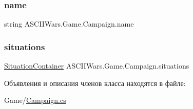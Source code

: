 \subsubsection{\texorpdfstring{name}{name}}
{\footnotesize\ttfamily string A\+S\+C\+I\+I\+Wars.\+Game.\+Campaign.\+name}

\hypertarget{class_a_s_c_i_i_wars_1_1_game_1_1_campaign_a5957bb2bca04dfed0b24eda637f0afad}{}\label{class_a_s_c_i_i_wars_1_1_game_1_1_campaign_a5957bb2bca04dfed0b24eda637f0afad} 
\subsubsection{\texorpdfstring{situations}{situations}}
{\footnotesize\ttfamily \hyperlink{class_a_s_c_i_i_wars_1_1_game_1_1_situation_container}{Situation\+Container} A\+S\+C\+I\+I\+Wars.\+Game.\+Campaign.\+situations}



Объявления и описания членов класса находятся в файле\+:\begin{DoxyCompactItemize}
\item 
Game/\hyperlink{_campaign_8cs}{Campaign.\+cs}\end{DoxyCompactItemize}
